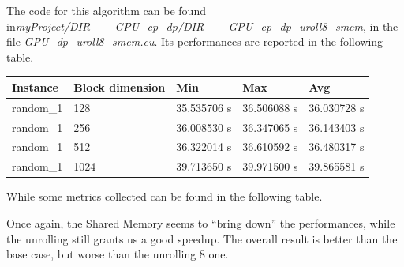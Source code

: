 \documentclass[12pt]{extarticle}
\begin{document}
The code for this algorithm can be found in\newline \emph{myProject/DIR\_\_\_GPU\_cp\_dp/DIR\_\_\_GPU\_cp\_dp\_uroll8\_smem}, in the file \emph{GPU\_dp\_uroll8\_smem.cu}.\newline
Its performances are reported in the following table.
\begin{center}
\begin{tabular}{ | m{2.2cm} | m{3.2cm} | m{2.2cm} | m{2.2cm} | m{2.2cm} |}
 \hline
 Instance & Block dimension & Min & Max & Avg\\
 \hline
 random\_1 & 128 & 35.535706 s & 36.506088 s & 36.030728 s\\
 \hline
 random\_1 & 256 & 36.008530 s & 36.347065 s & 36.143403 s\\
 \hline
 random\_1 & 512 & 36.322014 s & 36.610592 s & 36.480317 s\\
 \hline
 random\_1 & 1024 & 39.713650 s & 39.971500 s & 39.865581 s\\
 \hline
 \end{tabular}
 \end{center}
 While some metrics collected can be found in the following table.
\begin{center}
\noindent%
\end{center}
Once again, the Shared Memory seems to ``bring down'' the performances, while the unrolling still grants us a good speedup. The overall result is better than the base case, but worse than the unrolling 8 one.
\end{document}

